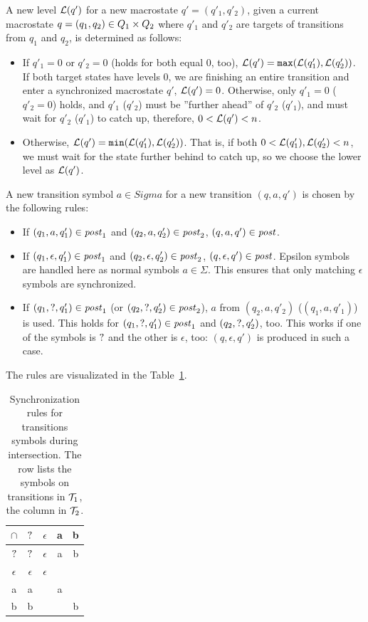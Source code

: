 A new level $\mathcal{L}(q')$ for a new macrostate $q' = (q'_1, q'_2)$, given a current macrostate $q = (q_1, q_2) \in Q_1 \times Q_2$ where $q'_1$ and $q'_2$ are targets of transitions from $q_1$ and $q_2$, is determined as follows:
\begin{itemize}
  \item If $q'_1 = 0$ or $q'_2 = 0$ (holds for both equal $0$, too), $\mathcal{L}(q') = \texttt{max}(\mathcal{L}(q'_1), \mathcal{L}(q'_2))$. If both target states have levels $0$, we are finishing an entire \nft transition and enter a synchronized macrostate $q'$, $\mathcal{L}(q') = 0$. Otherwise, only $q'_1 = 0$ ($q'_2 = 0$) holds, and $q'_1$ ($q'_2$) must be ''further ahead'' of $q'_2$ ($q'_1$), and must wait for $q'_2$ ($q'_1$) to catch up, therefore, $0 < \mathcal{L}(q') < n$.
  \item Otherwise, $\mathcal{L}(q') = \texttt{min}(\mathcal{L}(q'_1), \mathcal{L}(q'_2))$. That is, if both $0 < \mathcal{L}(q'_1), \mathcal{L}(q'_2) < n$, we must wait for the state further behind to catch up, so we choose the lower level as $\mathcal{L}(q')$.
\end{itemize}

A new transition symbol $a \in Sigma$ for a new transition $(q, a, q')$ is chosen by the following rules:
\begin{itemize}
  \item If $(q_1, a, q'_1) \in \mathit{post}_1$ and $(q_2, a, q'_2) \in \mathit{post}_2$, $(q, a, q') \in \mathit{post}$.
  \item If $(q_1, \epsilon, q'_1) \in \mathit{post}_1$ and $(q_2, \epsilon, q'_2) \in \mathit{post}_2$, $(q, \epsilon, q') \in \mathit{post}$. Epsilon symbols are handled here as normal symbols $a \in \Sigma$. This ensures that only matching $\epsilon$ symbols are synchronized.
  \item If $(q_1, ?, q'_1) \in \mathit{post}_1$ (or $(q_2, ?, q'_2) \in \mathit{post}_2$), $a$ from $(q_2, a, q'_2)$ ($(q_1, a, q'_1)$) is used.
  This holds for $(q_1, ?, q'_1) \in \mathit{post}_1$ and $(q_2, ?, q'_2)$, too.
  This works if one of the symbols is $?$ and the other is $\epsilon$, too: $(q, \epsilon, q')$ is produced in such a case.
\end{itemize}

The rules are visualizated in the Table~\ref{tab:synchronization_rules}.
\begin{table}[ht]
\centering
\begin{tabular}{ |c||c|c|c|c| }
 \hline
 $\cap$ & $?$ & $\epsilon$ & a & b \\
 \hline
 \hline
 $?$ & $?$ & $\epsilon$ & a & b \\
 \hline
 $\epsilon$ & $\epsilon$ & $\epsilon$ & & \\
 \hline
 a & a &  & a &\\
 \hline
 b & b &  & & b\\
 \hline
\end{tabular}
\caption{
  Synchronization rules for transitions symbols during intersection.
  The row lists the symbols on transitions in $\mathcal{T}_1$, the column in $\mathcal{T}_2$.
}
\label{tab:synchronization_rules}
\end{table}

